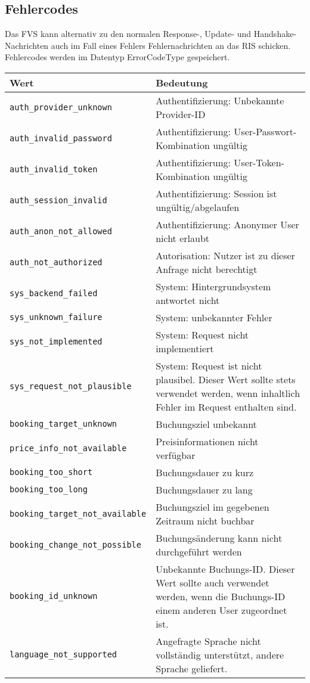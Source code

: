 \subsection*{Fehlercodes}
Das FVS kann alternativ zu den normalen Response-, Update- und Handshake-Nachrichten auch im Fall eines Fehlers Fehlernachrichten an das RIS schicken. Fehlercodes werden im Datentyp ErrorCodeType gespeichert.
\begin{flushleft}
\begin{tabularx}{\linewidth}{l>{\raggedright\arraybackslash}X} 
\toprule
Wert & Bedeutung\\
\midrule
\texttt{auth\_provider\_unknown} & Authentifizierung: Unbekannte Provider-ID\\
\texttt{auth\_invalid\_password} & Authentifizierung: User-Passwort-Kombination ungültig\\
\texttt{auth\_invalid\_token} & Authentifizierung: User-Token-Kombination ungültig\\
\texttt{auth\_session\_invalid} & Authentifizierung: Session ist ungültig/abgelaufen\\
\texttt{auth\_anon\_not\_allowed} & Authentifizierung: Anonymer User nicht erlaubt\\
\texttt{auth\_not\_authorized} & Autorisation: Nutzer ist zu dieser Anfrage nicht berechtigt\\
\texttt{sys\_backend\_failed} & System: Hintergrundsystem antwortet nicht\\
\texttt{sys\_unknown\_failure} & System: unbekannter Fehler\\
\texttt{sys\_not\_implemented} & System: Request nicht implementiert\\
\texttt{sys\_request\_not\_plausible} & System: Request ist nicht plausibel. Dieser Wert sollte stets verwendet werden, wenn inhaltlich Fehler im Request enthalten sind.\\
\texttt{booking\_target\_unknown} & Buchungsziel unbekannt\\
\texttt{price\_info\_not\_available} & Preisinformationen nicht verfügbar\\
\texttt{booking\_too\_short} & Buchungsdauer zu kurz\\
\texttt{booking\_too\_long} & Buchungsdauer zu lang\\
\texttt{booking\_target\_not\_available} & Buchungsziel im gegebenen Zeitraum nicht buchbar\\
\texttt{booking\_change\_not\_possible} & Buchungsänderung kann nicht durchgeführt werden\\
\texttt{booking\_id\_unknown} & Unbekannte Buchungs-ID. Dieser Wert sollte auch verwendet werden, wenn die Buchungs-ID einem anderen User zugeordnet ist.\\
\texttt{language\_not\_supported} & Angefragte Sprache nicht vollständig unterstützt, andere Sprache geliefert.\\
\bottomrule
\end{tabularx}
\end{flushleft}